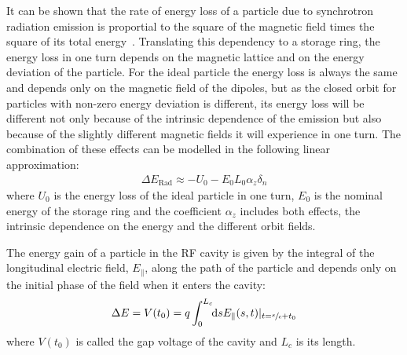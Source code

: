 	It can be shown that the rate of energy loss of a particle due to synchrotron radiation emission is proportial to the square of the magnetic field times the square of its total energy~\cite[pp. 123]{Jackson}. Translating this dependency to a storage ring, the energy loss in one turn depends on the magnetic lattice and on the energy deviation of the particle. For the ideal particle the energy loss is always the same and depends only on the magnetic field of the dipoles, but as the closed orbit for particles with non-zero energy deviation is different, its energy loss will be different not only because of the intrinsic dependence of the emission but also because of the slightly different magnetic fields it will experience in one turn. The combination of these effects can be modelled in the following linear approximation:
	\begin{align}\label{eq:radiation_loss}
		\Delta E_\text{Rad} \approx -U_0 - E_0L_0\alpha_z\delta_n
	\end{align}
	where $U_0$ is the energy loss of the ideal particle in one turn, $E_0$ is the nominal energy of the storage ring and the coefficient $\alpha_z$ includes both effects, the intrinsic dependence on the energy and the different orbit fields.

	The energy gain of a particle in the RF cavity is given by the integral of the longitudinal electric field, $E_\parallel$, along the path of the particle and depends only on the initial phase of the field when it enters the cavity:
	\begin{align}
		\Delta E = V(t_0) = q\defint{s}{E_\parallel(s,t)|_{t=\sfrac{s}{c}+t_0}}{0}{L_c}
	\end{align}
	where $V(t_0)$ is called the gap voltage of the cavity and $L_c$ is its length.

